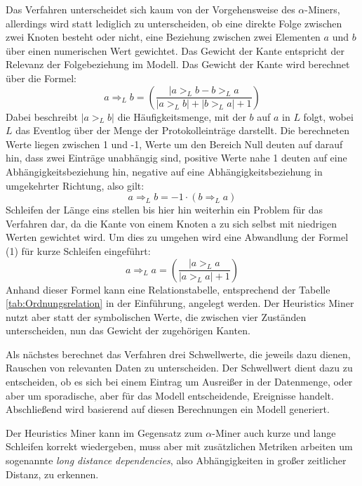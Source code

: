 Das Verfahren unterscheidet sich kaum von der Vorgehensweise des $\alpha$-Miners, allerdings wird statt lediglich zu unterscheiden, ob eine direkte Folge zwischen zwei Knoten besteht oder nicht, eine Beziehung zwischen zwei Elementen $a$ und $b$ über einen numerischen Wert gewichtet. Das Gewicht der Kante entspricht der Relevanz der Folgebeziehung im Modell. Das Gewicht der Kante wird berechnet über die Formel: 
\begin{equation}
 {a} \Rightarrow _L {b} = \left(\frac{ | {a} >_L {b} - {b} >_L {a} }{|{a} >_L {b}| + |{b} >_L {a}| + 1 }\right)
 \end{equation}
 Dabei beschreibt $|{a} >_L {b}|$ die Häufigkeitsmenge, mit der $b$ auf $a$ in $L$ folgt, wobei $L$ das Eventlog über der Menge der Protokolleinträge darstellt. Die berechneten Werte liegen zwischen 1 und -1, Werte um den Bereich Null deuten auf darauf hin, dass zwei Einträge unabhängig sind, positive Werte nahe 1 deuten auf eine Abhängigkeitsbeziehung hin, negative auf eine Abhängigkeitsbeziehung in umgekehrter Richtung, also gilt:
 \begin{equation}
 {a} \Rightarrow _L {b} =  -1 \cdot ( {b} \Rightarrow _L{a} )
 \end{equation}
Schleifen der Länge eins stellen bis hier hin weiterhin ein Problem für das Verfahren dar, da die Kante von einem Knoten a zu sich selbst mit niedrigen Werten gewichtet wird. Um dies zu umgehen wird eine Abwandlung der Formel (1) für kurze Schleifen eingeführt:
 \begin{equation}
 {a} \Rightarrow _L {a} = \left(\frac{ | {a} >_L {a}}{
|{a} >_L {a}| + 1 }\right)
 \end{equation}
Anhand dieser Formel kann eine Relationstabelle, entsprechend der Tabelle \ref{tab:Ordnungsrelation} in der Einführung, angelegt werden. Der Heuristics Miner nutzt aber statt der symbolischen Werte, die zwischen vier Zuständen unterscheiden, nun das Gewicht der zugehörigen Kanten. 

Als nächstes berechnet das Verfahren drei Schwellwerte, die jeweils dazu dienen, Rauschen von relevanten Daten zu unterscheiden. Der Schwellwert dient dazu zu entscheiden, ob es sich bei einem Eintrag um Ausreißer in der Datenmenge, oder aber um sporadische, aber für das Modell entscheidende, Ereignisse handelt. Abschließend wird basierend auf diesen Berechnungen ein Modell generiert.

Der Heuristics Miner kann im Gegensatz zum $\alpha$-Miner auch kurze und lange Schleifen korrekt wiedergeben, muss aber mit zusätzlichen Metriken arbeiten um sogenannte\textit{ long distance dependencies}, also Abhängigkeiten in großer zeitlicher Distanz, zu erkennen.

